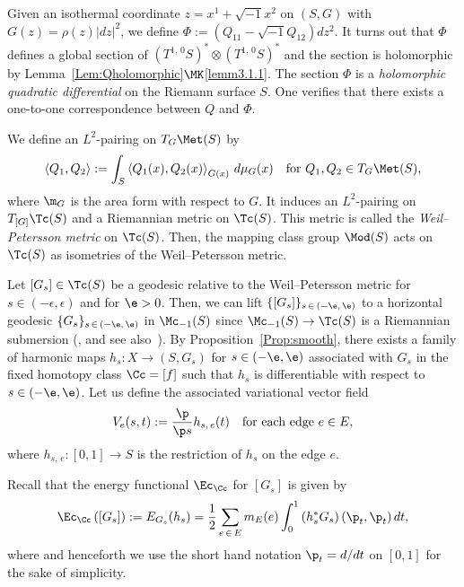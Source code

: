\begin{rema}\label{Rem:QD}
Given an isothermal coordinate $z=x^1+\sqrt{-1}x^2$ on $(S,G)$ with $G(z)=\rho(z)|dz|^2$, we define $\Phi:=(Q_{11}-\sqrt{-1}Q_{12})dz^2$. It turns out that $\Phi$ defines a global section of $(T^{1,\,0}S)^*\otimes (T^{1,\,0}S)^*$ and the section is holomorphic by Lemma~\ref{Lem:Qholomorphic}$\MK$\eqref{lemm3.1.1}. The section $\Phi$ is a \emph{holomorphic quadratic differential} on the Riemann surface $S$. One verifies that there exists a one-to-one correspondence between $Q$ and $\Phi$.
\end{rema}



We define an $L^2$-pairing on $T_G\Met(S)$ by
\[
\left\langle Q_1, Q_2\right\rangle:=\int_{S} \left\langle Q_1(x), Q_2(x)\right\rangle_{G(x)}\,d\mu_G(x) \quad \text{for }Q_1,Q_2\in T_G\Met(S),
\]
where $\m_G$ is the area form with respect to $G$. It induces an $L^2$-pairing on $T_{[G]}\Tc(S)$ and a Riemannian metric on $\Tc(S)$. This metric is called the \emph{Weil--Petersson metric} on $\Tc(S)$. Then, the mapping class group $\Mod(S)$ acts on $\Tc(S)$ as isometries of the Weil--Petersson metric.



Let $[G_{s}]\in \Tc(S)$ be a geodesic relative to the Weil--Petersson metric for $s \in (-\epsilon, \epsilon)$ and for $\e>0$. Then, we can lift $\{[G_{s}]\}_{s\,\in\,(-\e,\,\e)}$ to a horizontal geodesic $\{G_{s}\}_{s\, \in\,(-\e,\,\e)}$ in $\Mc_{-1}(S)$ since $\Mc_{-1}(S)\to \Tc(S)$ is a Riemannian submersion (\cite[Proposition~2.3.1]{Yamada}, and see also~\cite[Section~3.6]{Yamada2}). By Proposition~\ref{Prop:smooth}, there exists a family of harmonic maps $h_{s}: X \to (S, G_s)$ for $s \in (-\e, \e)$ associated with $G_{s}$ in the fixed homotopy class $\Cc=[f]$ such that $h_{s}$ is differentiable with respect to $s \in (-\e, \e)$. Let us define the associated variational vector field
\[
V_e(s,t):=\frac{\p}{\p s}h_{s,\,e}(t) \quad \text{for each edge }e\in E,
\]
where $h_{s,\,e}:[0, 1] \to S$ is the restriction of $h_s$ on the edge $e$.


Recall that the energy functional $\Ec_{\Cc}$ for $[G_{s}]$ is given by
\[
\Ec_{\Cc}\left(\left[G_{s}\right]\right):=E_{G_{s}}(h_{s})=
\frac{1}{2}\sum_{e\,\in\,E}m_E(e)\int_{0}^1\left(h_{s}^*G_{s}\right)\left(\p_{t},\p_{t}\right)dt,
\]
where and henceforth we use the short hand notation $\p_t=d/dt$ on $[0, 1]$ for the sake of simplicity.

